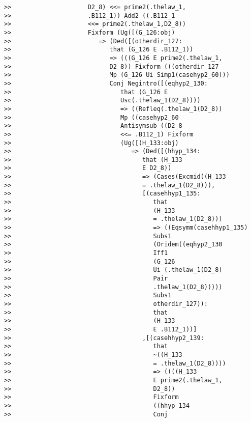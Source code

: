 \documentclass[12pt]{article}
\begin{document}
\begin{verbatim}
>>                     D2_8) <<= prime2(.thelaw_1,
>>                     .B112_1)) Add2 ((.B112_1
>>                     <<= prime2(.thelaw_1,D2_8))
>>                     Fixform (Ug([(G_126:obj)
>>                        => (Ded([(otherdir_127:
>>                           that (G_126 E .B112_1))
>>                           => (((G_126 E prime2(.thelaw_1,
>>                           D2_8)) Fixform (((otherdir_127
>>                           Mp (G_126 Ui Simp1(casehyp2_60)))
>>                           Conj Negintro([(eqhyp2_130:
>>                              that (G_126 E
>>                              Usc(.thelaw_1(D2_8))))
>>                              => ((Refleq(.thelaw_1(D2_8))
>>                              Mp ((casehyp2_60
>>                              Antisymsub ((D2_8
>>                              <<= .B112_1) Fixform
>>                              (Ug([(H_133:obj)
>>                                 => (Ded([(hhyp_134:
>>                                    that (H_133
>>                                    E D2_8))
>>                                    => (Cases(Excmid((H_133
>>                                    = .thelaw_1(D2_8))),
>>                                    [(casehhyp1_135:
>>                                       that
>>                                       (H_133
>>                                       = .thelaw_1(D2_8)))
>>                                       => ((Eqsymm(casehhyp1_135)
>>                                       Subs1
>>                                       (Oridem((eqhyp2_130
>>                                       Iff1
>>                                       (G_126
>>                                       Ui (.thelaw_1(D2_8)
>>                                       Pair
>>                                       .thelaw_1(D2_8)))))
>>                                       Subs1
>>                                       otherdir_127)):
>>                                       that
>>                                       (H_133
>>                                       E .B112_1))]
>>                                    ,[(casehhyp2_139:
>>                                       that
>>                                       ~((H_133
>>                                       = .thelaw_1(D2_8))))
>>                                       => ((((H_133
>>                                       E prime2(.thelaw_1,
>>                                       D2_8))
>>                                       Fixform
>>                                       ((hhyp_134
>>                                       Conj

\end{verbatim}
\end{document}
